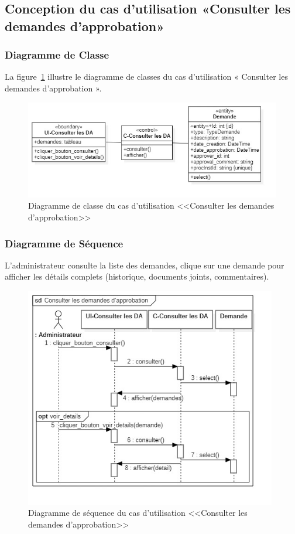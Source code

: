 \subsection{Conception du cas d’utilisation «Consulter les demandes d’approbation»}
\subsubsection{Diagramme de Classe}
La figure~\ref{fig:c_cdapprob} illustre le diagramme de classes du cas d'utilisation « Consulter les demandes d’approbation ».
\begin{figure}[h]
     \centering
     \includegraphics[width=13cm]{images/c_cdapprob.jpg}
     \caption{Diagramme de classe du cas d'utilisation <<Consulter les demandes d’approbation>>}
     \label{fig:c_cdapprob}
\end{figure}
\subsubsection{Diagramme de Séquence}
L'administrateur consulte la liste des demandes, clique sur une demande pour afficher les détails complets (historique, documents joints, commentaires).
\begin{figure}[ht]
    \centering
    \includegraphics[width=11cm, height=0.8\textheight, keepaspectratio]{images/s_cdapprob.jpg}
    \caption{Diagramme de séquence du cas d'utilisation <<Consulter les demandes d’approbation>>}
    \label{fig:s_cdapprob}
\end{figure}
\newpage
\vspace*{-1.5cm}
